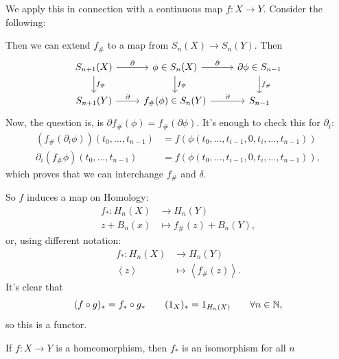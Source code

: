 We apply this in connection with a continuous map $f: X \to Y$.
Consider the following:

\begin{figure}[H]
    \centering
    \label{fig:homology-connection-with-continuous-map}
\end{figure}

Then we can extend $f_\#$ to a map from  $S_n(X) \to  S_n(Y)$.
Then
\[
    \begin{tikzcd}
        S_{n+1}(X) \arrow[r, "\partial"]  \arrow[d, "f_\#"]& \phi \in S_n(X) \arrow[d, "f_\#"]\arrow[r, "\partial"] &\partial\phi \in S_{n-1}\arrow[d, "f_\#"]\\
        S_{n+1}(Y) \arrow[r, "\partial"] & f_\#(\phi) \in S_n(Y) \arrow[r, "\partial"] &S_{n-1}
    \end{tikzcd}
\]
Now, the question is, is $\partial f_\#(\phi) = f_\# ( \partial\phi)$.
It's enough to check this for $\partial_i$:
\begin{align*}
    (f_\#(\partial_i \phi))(t_0, \ldots, t_{n-1}) &= f(\phi(t_0, \ldots, t_{i-1}, 0, t_i, \ldots, t_{n-1}))\\
    \partial_i (f_\# \phi)(t_0, \ldots, t_{n-1}) &= f(\phi(t_0, \ldots, t_{i-1}, 0, t_i, \ldots, t_{n-1}))
,\end{align*}
which proves that we can interchange $f_\#$ and $\delta$.

So $f$ induces a map on Homology:
\begin{align*}
    f_*: H_n(X) &\longrightarrow H_n(Y) \\
    z+B_n(x) &\longmapsto f_\#(z) + B_n(Y)
,\end{align*}
or, using different notation:
\begin{align*}
    f_*: H_n(X) &\longrightarrow H_n(Y) \\
    \left<z \right> &\longmapsto \left<f_\#(z) \right>
.\end{align*}
It's clear that
\[
    (f  \circ  g)_* = f_*  \circ  g_* \qquad (1_X)_* = 1_{H_n(X)} \qquad \forall n \in \mathbb{N}
,\] 
so this is a functor.
\begin{theorem}
    If $f: X \to  Y$ is a homeomorphism, then $f_*$ is an isomorphism for all $n$
\end{theorem}


